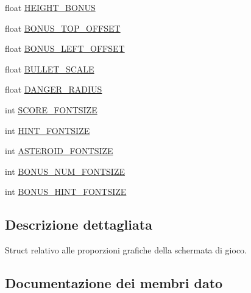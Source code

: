 \begin{DoxyCompactItemize}
\item 
float \hyperlink{structplaywa__gv__t_ab1048ed8ae314cb83891cc0d7c7b55c3}{H\+E\+I\+G\+H\+T\+\_\+\+B\+O\+N\+US}
\item 
float \hyperlink{structplaywa__gv__t_a8952f3695790bd9febd350cd611e5be3}{B\+O\+N\+U\+S\+\_\+\+T\+O\+P\+\_\+\+O\+F\+F\+S\+ET}
\item 
float \hyperlink{structplaywa__gv__t_abc338632a7afb443ee3ece0c73f13c0c}{B\+O\+N\+U\+S\+\_\+\+L\+E\+F\+T\+\_\+\+O\+F\+F\+S\+ET}
\item 
float \hyperlink{structplaywa__gv__t_add8c8ba2812be2c2490fd1c474c089ee}{B\+U\+L\+L\+E\+T\+\_\+\+S\+C\+A\+LE}
\item 
float \hyperlink{structplaywa__gv__t_afd29a2a79501ace74c1b139f2df0ade5}{D\+A\+N\+G\+E\+R\+\_\+\+R\+A\+D\+I\+US}
\item 
int \hyperlink{structplaywa__gv__t_afbd99efe19c1524a47f8eafb0062a913}{S\+C\+O\+R\+E\+\_\+\+F\+O\+N\+T\+S\+I\+ZE}
\item 
int \hyperlink{structplaywa__gv__t_a841fda5096e0a8af41f3fed808690de0}{H\+I\+N\+T\+\_\+\+F\+O\+N\+T\+S\+I\+ZE}
\item 
int \hyperlink{structplaywa__gv__t_a0525f27765ca5730649792c9f9f6495b}{A\+S\+T\+E\+R\+O\+I\+D\+\_\+\+F\+O\+N\+T\+S\+I\+ZE}
\item 
int \hyperlink{structplaywa__gv__t_a4514f649c358096446711d2ca1c67464}{B\+O\+N\+U\+S\+\_\+\+N\+U\+M\+\_\+\+F\+O\+N\+T\+S\+I\+ZE}
\item 
int \hyperlink{structplaywa__gv__t_aecb9b240fc6c2108aa2a7ab1a73342a1}{B\+O\+N\+U\+S\+\_\+\+H\+I\+N\+T\+\_\+\+F\+O\+N\+T\+S\+I\+ZE}
\end{DoxyCompactItemize}


\subsection{Descrizione dettagliata}
Struct relativo alle proporzioni grafiche della schermata di gioco. 

\subsection{Documentazione dei membri dato}
\mbox{\label{structplaywa__gv__t_a0525f27765ca5730649792c9f9f6495b}} 
